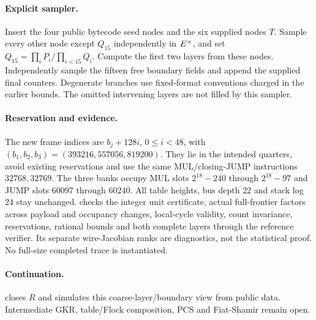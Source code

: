 \paragraph{Explicit sampler.} Insert the four public bytecode seed nodes and the six supplied nodes $T$. Sample every other node except $Q_{15}$ independently in $E^\times$, and set $Q_{15}=\prod_iP_i/\prod_{i<15}Q_i$. Compute the first two layers from these nodes. Independently sample the fifteen free boundary fields and append the supplied final counters. Degenerate branches use fixed-format conventions charged in the earlier bounds. The omitted intervening layers are not filled by this sampler.

\paragraph{Reservation and evidence.} The new frame indices are $b_j+128i$, $0\le i<48$, with $(b_1,b_2,b_3)=(393216,557056,819200)$. They lie in the intended quarters, avoid existing reservations and use the same MUL/closing-JUMP instructions $32768,32769$. The three banks occupy MUL slots $2^{18}-240$ through $2^{18}-97$ and JUMP slots $60097$ through $60240$. All table heights, bus depth $22$ and stack log $24$ stay unchanged.  checks the integer unit certificate, actual full-frontier factors across payload and occupancy changes, local-cycle validity, count invariance, reservations, rational bounds and both complete layers through the reference verifier. Its separate wire-Jacobian ranks are diagnostics, not the statistical proof. No full-size completed trace is instantiated.

\paragraph{Continuation.}  closes $R$ and simulates this coarse-layer/boundary view from public data. Intermediate GKR, table/Flock composition, PCS and Fiat-Shamir remain open.
